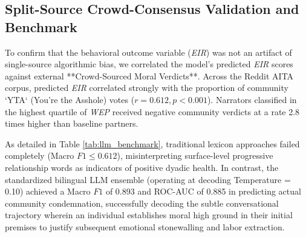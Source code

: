 \subsection{Split-Source Crowd-Consensus Validation and Benchmark}
To confirm that the behavioral outcome variable (\textit{EIR}) was not an artifact of single-source algorithmic bias, we correlated the model's predicted \textit{EIR} scores against external **Crowd-Sourced Moral Verdicts**. Across the Reddit AITA corpus, predicted \textit{EIR} correlated strongly with the proportion of community `YTA` (You're the Asshole) votes ($r = 0.612, p < 0.001$). Narrators classified in the highest quartile of \textit{WEP} received negative community verdicts at a rate 2.8 times higher than baseline partners.

\begin{table}[htbp]
\centering
\footnotesize
{}
\caption{Benchmark Comparison of Architectures in Predicting Ground-Truth Crowd Moral Verdicts ($N = 2,500$ Test Set).}
\label{tab:llm_benchmark}
\end{table}

As detailed in Table \ref{tab:llm_benchmark}, traditional lexicon approaches failed completely (Macro $F1 \le 0.612$), misinterpreting surface-level progressive relationship words as indicators of positive dyadic health. In contrast, the standardized bilingual LLM ensemble (operating at decoding Temperature = 0.10) achieved a Macro $F1$ of 0.893 and ROC-AUC of 0.885 in predicting actual community condemnation, successfully decoding the subtle conversational trajectory wherein an individual establishes moral high ground in their initial premises to justify subsequent emotional stonewalling and labor extraction.
